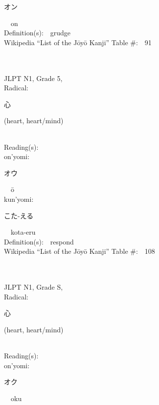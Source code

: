 \begin{multicols}{2}
{\hspace*{2em}}{\begin{CJK}{UTF8}{min} オン \end{CJK}}\ \ on\ \ \\
Definition(s):\ \ grudge \\
Wikipedia ``List of the J\=oy\=o Kanji'' Table \#:\ \ 91 \\
\ \ \\
{\fontsize{34pt}{40pt}  }\ \ \\  %
{JLPT N1, Grade 5, \\Radical:\ \ {\begin{CJK}{UTF8}{min} 心 \end{CJK}} (heart, heart/mind) } \\
Reading(s):\ \ \\
{\hspace*{1em}}on'yomi:\ \ \\
{\hspace*{2em}}{\begin{CJK}{UTF8}{min} オウ \end{CJK}}\ \ \=o\ \ \\
{\hspace*{1em}}kun'yomi:\ \ \\
{\hspace*{2em}}{\begin{CJK}{UTF8}{min} こた-える \end{CJK}}\ \ kota-eru\ \ \\
Definition(s):\ \ respond \\
Wikipedia ``List of the J\=oy\=o Kanji'' Table \#:\ \ 108 \\
\ \ \\
{\fontsize{34pt}{40pt}  }\ \ \\
{JLPT N1, Grade S, \\Radical:\ \ {\begin{CJK}{UTF8}{min} 心 \end{CJK}} (heart, heart/mind) } \\
Reading(s):\ \ \\
{\hspace*{1em}}on'yomi:\ \ \\
{\hspace*{2em}}{\begin{CJK}{UTF8}{min} オク \end{CJK}}\ \ oku\ \ \\

\end{multicols}
